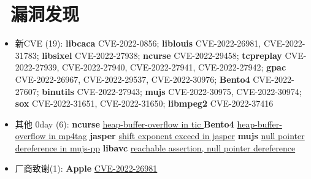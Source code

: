 \documentclass{resume}
\begin{document}
\section{\faInfo\ 漏洞发现}
\begin{itemize}[parsep=0.5ex]
  \item 新CVE (19): 
  \textbf{libcaca}   CVE-2022-0856; 
  \textbf{liblouis}  CVE-2022-26981, CVE-2022-31783; 
  \textbf{libsixel}  CVE-2022-27938; 
  \textbf{ncurse}    CVE-2022-29458; 
  \textbf{tcpreplay} CVE-2022-27939, CVE-2022-27940, CVE-2022-27941, CVE-2022-27942; 
  \textbf{gpac}      CVE-2022-26967, CVE-2022-29537, CVE-2022-30976; 
  \textbf{Bento4}    CVE-2022-27607; 
  \textbf{binutils}  CVE-2022-27943; 
  \textbf{mujs}      CVE-2022-30975, CVE-2022-30974; 
  \textbf{sox}       CVE-2022-31651, CVE-2022-31650; 
  \textbf{libmpeg2}  CVE-2022-37416
  \item 其他 0day (6): 
  \textbf{ncurse}    \href{https://lists.gnu.org/archive/html/bug-ncurses/2022-04/msg00022.html}{heap-buffer-overflow in tic }
  \textbf{Bento4}    \href{https://github.com/axiomatic-systems/Bento4/issues/677}{heap-buffer-overflow in mp4tag}
  \textbf{jasper}    \href{https://github.com/jasper-software/jasper/issues/311}{shift exponent exceed in jasper}
  \textbf{mujs}      \href{https://github.com/ccxvii/mujs/issues/161#BUG1}{null pointer dereference in mujs-pp}
  \textbf{libavc}    \href{https://issuetracker.google.com/issues/223984040}{reachable assertion, } \href{https://issuetracker.google.com/issues/224160472}{null pointer dereference}
  \item 厂商致谢(1):
  \textbf{Apple} \href{https://support.apple.com/en-us/HT213342}{CVE-2022-26981}

\end{itemize}



\end{document}

